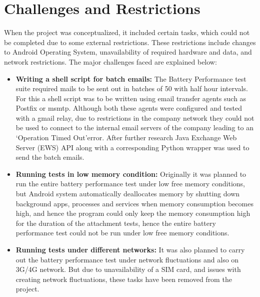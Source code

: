 \setlength\parindent{0pt}

\chapter{Challenges and Restrictions}

When the project was conceptualized, it included certain tasks, which could not be completed due to some external restrictions. These restrictions include changes to Android Operating System, unavailability of required hardware and data, and network restrictions. The major challenges faced are explained below:

\begin{itemize}
	\item\textbf{Writing a shell script for batch emails:} The Battery Performance test suite required mails to be sent out in batches of 50 with half hour intervals. For this a shell script was to be written using email transfer agents such as Postfix or msmtp. Although both these agents were configured and tested with a gmail relay, due to restrictions in the company network they could not be used to connect to the internal email servers of the company leading to an `Operation Timed Out'error. After further research Java Exchange Web Server (EWS) API along with a corresponding Python wrapper was used to send the batch emails.

	\item\textbf{Running tests in low memory condition:} Originally it was planned to run the entire battery performance test under low free memory conditions, but Android system automatically deallocates memory by shutting down background apps, processes and services when memory consumption becomes high, and hence the program could only keep the memory consumption high for the duration of the attachment tests, hence the entire battery performance test could not be run under low free memory conditions. \\

	\item\textbf{Running tests under different networks:} It was also planned to carry out the battery performance test under network fluctuations and also on 3G/4G network. But due to unavailability of a SIM card, and issues with creating network fluctuations, these tasks have been removed from the project.\\



\end{itemize}
